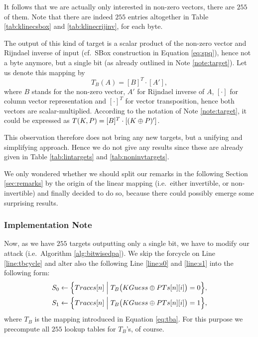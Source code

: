 It follows that we are actually only interested in non-zero vectors, there are $255$ of them. Note that there are indeed $255$ entries altogether in Table \ref{tab:klinecsbox} and \ref{tab:klinecrijinv}, for each byte.

The output of this kind of target is a scalar product of the non-zero vector and Rijndael inverse of input (cf.\ SBox construction in Equation \ref{eq:spq}), hence not a byte anymore, but a single bit (as already outlined in Note \ref{note:target}). Let us denote this mapping by
\begin{equation}
\label{eq:tba}
	T_B(A) = [B]^T\cdot [A'] ,
\end{equation}
where $B$ stands for the non-zero vector, $A'$ for Rijndael inverse of $A$, $[\cdot]$ for column vector representation and $[\cdot]^T$ for vector transposition, hence both vectors are scalar-multiplied. According to the notation of Note \ref{note:target}, it could be expressed as $T(K,P) = [B]^T\cdot [(K\oplus P)']$.

This observation therefore does not bring any new targets, but a unifying and simplifying approach. Hence we do not give any results since these are already given in Table \ref{tab:lintargets} and \ref{tab:noninvtargets}.

We only wondered whether we should split our remarks in the following Section \ref{sec:remarks} by the origin of the linear mapping (i.e.\ either invertible, or non-invertible) and finally decided to do so, because there could possibly emerge some surprising results.

\subsubsection{Implementation Note}
	
	Now, as we have $255$ targets outputting only a single bit, we have to modify our attack (i.e.\ Algorithm \ref{alg:bitwisedpa}). We skip the forcycle on Line \ref{line:tbcycle} and alter also the following Line \ref{line:s0} and \ref{line:s1} into the following form:
	\begin{align*}
		S_0 &\gets \Bigl\{ Traces[n] \Bigm| T_B\bigl(KGuess\oplus PTs[n][i]\bigr) = 0 \Bigr\} , \\
		S_1 &\gets \Bigl\{ Traces[n] \Bigm| T_B\bigl(KGuess\oplus PTs[n][i]\bigr) = 1 \Bigr\} ,
	\end{align*}
	where $T_B$ is the mapping introduced in Equation \ref{eq:tba}. For this purpose we precompute all $255$ lookup tables for $T_B$'s, of course.
	
